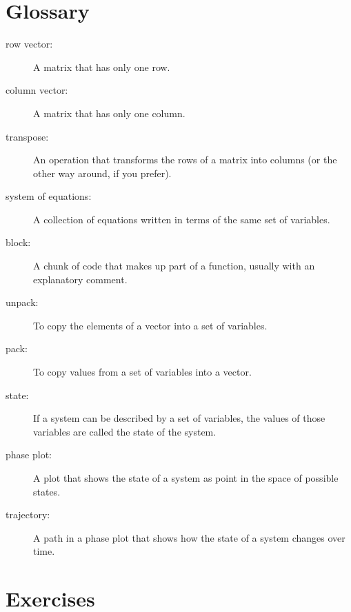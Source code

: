 \documentclass{book}
\begin{document}
\section{Glossary}

\begin{description}

\item[row vector:] A matrix that has only one row.

\item[column vector:] A matrix that has only one column.

\item[transpose:] An operation that transforms the rows of a matrix
into columns (or the other way around, if you prefer).

\item[system of equations:] A collection of equations written in terms of
the same set of variables.

\item[block:] A chunk of code that makes up part of a function,
usually with an explanatory comment.

\item[unpack:] To copy the elements of a vector into a set of variables.

\item[pack:] To copy values from a set of variables into a vector.

\item[state:] If a system can be described by a set of variables,
the values of those variables are called the state of the system.

\item[phase plot:] A plot that shows the state of a system as point
in the space of possible states.

\item[trajectory:] A path in a phase plot that shows how the state of
a system changes over time.


\end{description}

\section{Exercises}
\end{document}
